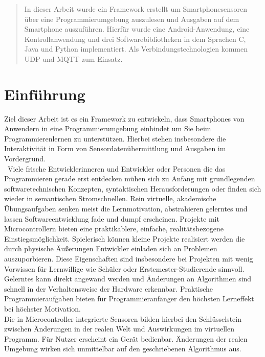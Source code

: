 \documentclass[11pt,a4paper]{report}
\begin{document}

\begin{abstract}
In dieser Arbeit wurde ein Framework erstellt um Smartphonesensoren über eine Programmierumgebung auszulesen und Ausgaben auf dem Smartphone auszuführen.
Hierfür wurde eine Android-Anwendung, eine Kontrollanwendung und drei Softwarebibliotheken in dem Sprachen C, Java und Python implementiert.
Als Verbindungstechnologien kommen UDP und MQTT zum Einsatz.
\end{abstract}

\tableofcontents

\chapter{Einführung} \label{chap:intro}
Ziel dieser Arbeit ist es ein Framework zu entwickeln, dass Smartphones von Anwendern in eine Programmierumgebung einbindet um Sie beim Programmierenlernen zu unterstützen.
Hierbei stehen insbesondere die Interaktivität in Form von Sensordatenübermittlung und Ausgaben im Vordergrund.
\\\
Viele frische Entwicklerinneren und Entwickler oder Personen die das Programmieren gerade erst entdecken mühen sich zu Anfang mit grundlegenden softwaretechnischen Konzepten, syntaktischen Herausforderungen oder finden sich wieder in semantischen Stromschnellen.
Rein virtuelle, akademische Übungsaufgaben senken meist die Lernmotivation, abstrahieren gelerntes und lassen Softwareentwicklung fade und dumpf erscheinen.
Projekte mit Microcontrollern bieten eine praktikablere, einfache, realitätsbezogene Einstiegsmöglichkeit.
Spielerisch können kleine Projekte realisiert werden die durch physische Äußerungen Entwickler einladen sich an Problemen auszuporbieren.
Diese Eigenschaften sind insbesondere bei Projekten mit wenig Vorwissen für Lernwillige wie Schüler oder Erstemester-Studierende sinnvoll.
Gelerntes kann direkt angewand werden und Änderungen an Algorithmen sind schnell in der Verhaltensweise der Hardware erkennbar.
Praktische Programmieraufgaben bieten für Programmieranfänger den höchsten Lerneffekt bei höchster Motivation.\cite{learning_computer_programming}
\\
Die in Microcontroller integrierte Sensoren bilden hierbei den Schlüsselstein zwischen Änderungen in der realen Welt und Auswirkungen im virtuellen Programm.
Für Nutzer erscheint ein Gerät bedienbar.
Änderungen der realen Umgebung wirken sich unmittelbar auf den geschriebenen Algorithmus aus.
\end{document}
